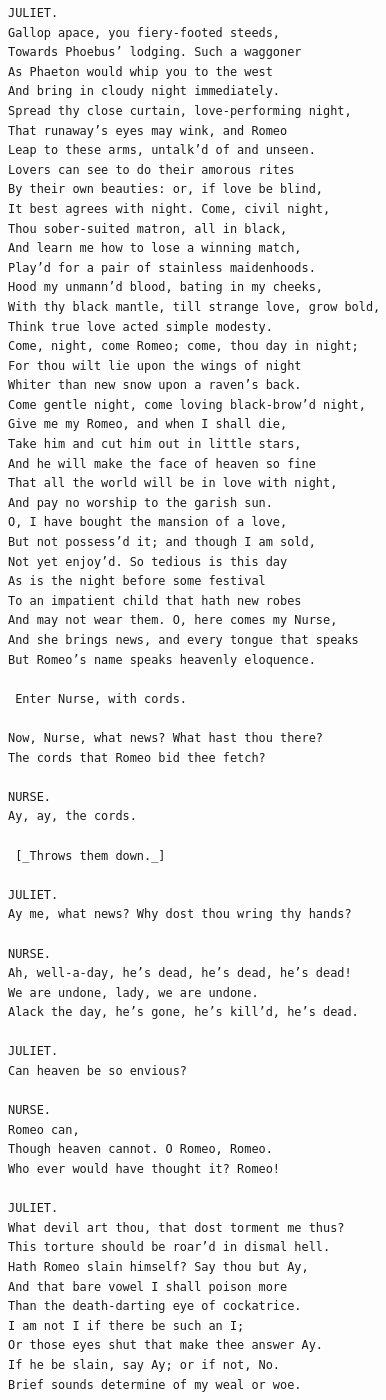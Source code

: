 \documentclass{article}
\begin{document}
\begin{verbatim}
JULIET.
Gallop apace, you fiery-footed steeds,
Towards Phoebus’ lodging. Such a waggoner
As Phaeton would whip you to the west
And bring in cloudy night immediately.
Spread thy close curtain, love-performing night,
That runaway’s eyes may wink, and Romeo
Leap to these arms, untalk’d of and unseen.
Lovers can see to do their amorous rites
By their own beauties: or, if love be blind,
It best agrees with night. Come, civil night,
Thou sober-suited matron, all in black,
And learn me how to lose a winning match,
Play’d for a pair of stainless maidenhoods.
Hood my unmann’d blood, bating in my cheeks,
With thy black mantle, till strange love, grow bold,
Think true love acted simple modesty.
Come, night, come Romeo; come, thou day in night;
For thou wilt lie upon the wings of night
Whiter than new snow upon a raven’s back.
Come gentle night, come loving black-brow’d night,
Give me my Romeo, and when I shall die,
Take him and cut him out in little stars,
And he will make the face of heaven so fine
That all the world will be in love with night,
And pay no worship to the garish sun.
O, I have bought the mansion of a love,
But not possess’d it; and though I am sold,
Not yet enjoy’d. So tedious is this day
As is the night before some festival
To an impatient child that hath new robes
And may not wear them. O, here comes my Nurse,
And she brings news, and every tongue that speaks
But Romeo’s name speaks heavenly eloquence.

 Enter Nurse, with cords.

Now, Nurse, what news? What hast thou there?
The cords that Romeo bid thee fetch?

NURSE.
Ay, ay, the cords.

 [_Throws them down._]

JULIET.
Ay me, what news? Why dost thou wring thy hands?

NURSE.
Ah, well-a-day, he’s dead, he’s dead, he’s dead!
We are undone, lady, we are undone.
Alack the day, he’s gone, he’s kill’d, he’s dead.

JULIET.
Can heaven be so envious?

NURSE.
Romeo can,
Though heaven cannot. O Romeo, Romeo.
Who ever would have thought it? Romeo!

JULIET.
What devil art thou, that dost torment me thus?
This torture should be roar’d in dismal hell.
Hath Romeo slain himself? Say thou but Ay,
And that bare vowel I shall poison more
Than the death-darting eye of cockatrice.
I am not I if there be such an I;
Or those eyes shut that make thee answer Ay.
If he be slain, say Ay; or if not, No.
Brief sounds determine of my weal or woe.


\end{verbatim}
\end{document}
